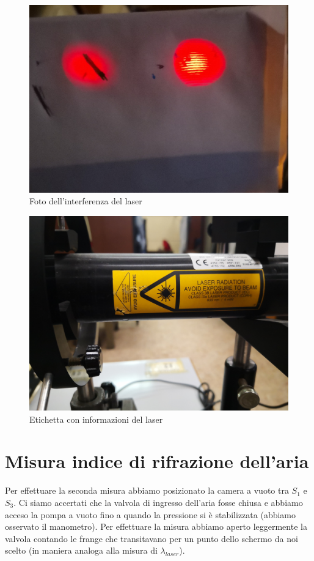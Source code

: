 \documentclass{article}
\begin{document}
\begin{figure}[h!]
  \centering
  \includegraphics[width=0.6\linewidth]{IM laser}
  \caption{Foto dell'interferenza del laser}
\end{figure}

\begin{figure}[h!]
  \centering
  \includegraphics[width=0.6\linewidth]{IM etichetta laser}
  \caption{Etichetta con informazioni del laser}
\end{figure}

\pagebreak

\section{Misura indice di rifrazione dell'aria}
Per effettuare la seconda misura abbiamo posizionato la camera a vuoto tra $S_1$ e $S_3$. Ci siamo accertati che la valvola di ingresso dell'aria fosse chiusa e abbiamo acceso la pompa a vuoto fino a quando la pressione si è stabilizzata (abbiamo osservato il manometro). Per effettuare la misura abbiamo aperto leggermente la valvola contando le frange che transitavano per un punto dello schermo da noi scelto (in maniera analoga alla misura di $\lambda_{laser}$).
\end{document}
